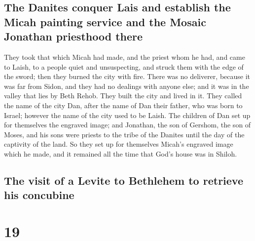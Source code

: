 \hypertarget{the-danites-conquer-lais-and-establish-the-micah-painting-service-and-the-mosaic-jonathan-priesthood-there}{%
\subsection{The Danites conquer Lais and establish the Micah painting
service and the Mosaic Jonathan priesthood
there}\label{the-danites-conquer-lais-and-establish-the-micah-painting-service-and-the-mosaic-jonathan-priesthood-there}}

 They took that which Micah had made, and the priest whom
he had, and came to Laish, to a people quiet and unsuspecting, and
struck them with the edge of the sword; then they burned the city with
fire.  There was no deliverer, because it was far from
Sidon, and they had no dealings with anyone else; and it was in the
valley that lies by Beth Rehob. They built the city and lived in it.
 They called the name of the city Dan, after the name of
Dan their father, who was born to Israel; however the name of the city
used to be Laish.  The children of Dan set up for
themselves the engraved image; and Jonathan, the son of Gershom, the son
of Moses, and his sons were priests to the tribe of the Danites until
the day of the captivity of the land.  So they set up for
themselves Micah's engraved image which he made, and it remained all the
time that God's house was in Shiloh.

\hypertarget{the-visit-of-a-levite-to-bethlehem-to-retrieve-his-concubine}{%
\subsection{The visit of a Levite to Bethlehem to retrieve his
concubine}\label{the-visit-of-a-levite-to-bethlehem-to-retrieve-his-concubine}}

\hypertarget{section-18}{%
\section{19}\label{section-18}}

